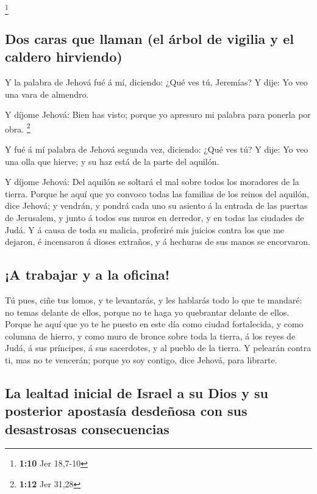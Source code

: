 \footnote{\textbf{1:10} Jer 18,7-10}

\hypertarget{dos-caras-que-llaman-el-uxe1rbol-de-vigilia-y-el-caldero-hirviendo}{%
\subsection{Dos caras que llaman (el árbol de vigilia y el caldero
hirviendo)}\label{dos-caras-que-llaman-el-uxe1rbol-de-vigilia-y-el-caldero-hirviendo}}

 Y la palabra de Jehová fué á mí, diciendo: ¿Qué ves tú,
Jeremías? Y dije: Yo veo una vara de almendro.

 Y díjome Jehová: Bien has visto; porque yo apresuro mi
palabra para ponerla por obra. \footnote{\textbf{1:12} Jer 31,28}

 Y fué á mí palabra de Jehová segunda vez, diciendo: ¿Qué
ves tú? Y dije: Yo veo una olla que hierve; y su haz está de la parte
del aquilón.

 Y díjome Jehová: Del aquilón se soltará el mal sobre
todos los moradores de la tierra.  Porque he aquí que yo
convoco todas las familias de los reinos del aquilón, dice Jehová; y
vendrán, y pondrá cada uno su asiento á la entrada de las puertas de
Jerusalem, y junto á todos sus muros en derredor, y en todas las
ciudades de Judá.  Y á causa de toda su malicia,
proferiré mis juicios contra los que me dejaron, é incensaron á dioses
extraños, y á hechuras de sus manos se encorvaron.

\hypertarget{a-trabajar-y-a-la-oficina}{%
\subsection{¡A trabajar y a la
oficina!}\label{a-trabajar-y-a-la-oficina}}

 Tú pues, ciñe tus lomos, y te levantarás, y les hablarás
todo lo que te mandaré: no temas delante de ellos, porque no te haga yo
quebrantar delante de ellos.  Porque he aquí que yo te he
puesto en este día como ciudad fortalecida, y como columna de hierro, y
como muro de bronce sobre toda la tierra, á los reyes de Judá, á sus
príncipes, á sus sacerdotes, y al pueblo de la tierra.  Y
pelearán contra ti, mas no te vencerán; porque yo soy contigo, dice
Jehová, para librarte.

\hypertarget{la-lealtad-inicial-de-israel-a-su-dios-y-su-posterior-apostasuxeda-desdeuxf1osa-con-sus-desastrosas-consecuencias}{%
\subsection{La lealtad inicial de Israel a su Dios y su posterior
apostasía desdeñosa con sus desastrosas
consecuencias}\label{la-lealtad-inicial-de-israel-a-su-dios-y-su-posterior-apostasuxeda-desdeuxf1osa-con-sus-desastrosas-consecuencias}}

